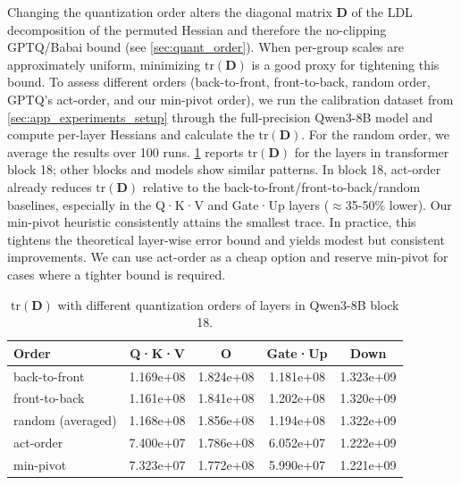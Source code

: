 \documentclass{article} %
\begin{document}
Changing the quantization order alters the diagonal matrix $\bm{D}$ of the LDL decomposition of the permuted Hessian and therefore the no-clipping GPTQ/Babai bound (see \cref{sec:quant_order}).
When per-group scales are approximately uniform, minimizing $\mathrm{tr} \left( \bm{D} \right)$ is a good proxy for tightening this bound.
To assess different orders (back-to-front, front-to-back, random order, GPTQ's act-order, and our min-pivot order), we run the calibration dataset from \cref{sec:app_experiments_setup} through the full-precision Qwen3-8B model and compute per-layer Hessians and calculate the $\mathrm{tr} \left( \bm{D} \right)$.
For the random order, we average the results over 100 runs.
\cref{tab:quant_order} reports $\mathrm{tr} \left( \bm{D} \right)$ for the layers in transformer block 18; other blocks and models show similar patterns.
In block 18, act-order already reduces $\mathrm{tr} \left( \bm{D} \right)$ relative to the back-to-front/front-to-back/random baselines, especially in the Q·K·V and Gate·Up layers ($\approx$35-50\% lower).
Our min-pivot heuristic consistently attains the smallest trace.
In practice, this tightens the theoretical layer-wise error bound and yields modest but consistent improvements.
We can use act-order as a cheap option and reserve min-pivot for cases where a tighter bound is required.

\begin{table}[htpb]
\caption{$\mathrm{tr} \left( \bm{D} \right)$ with different quantization orders of layers in Qwen3-8B block 18.}
\label{tab:quant_order}
\begin{center}
\begin{tabular}{lcccc}
\toprule
Order & Q·K·V & O & Gate·Up & Down \\
\midrule
back-to-front & 1.169e+08 & 1.824e+08 & 1.181e+08 & 1.323e+09 \\
\midrule
front-to-back & 1.161e+08 & 1.841e+08 & 1.202e+08 & 1.320e+09 \\
\midrule
random (averaged) & 1.168e+08 & 1.856e+08 & 1.194e+08 & 1.322e+09 \\
\midrule
act-order & 7.400e+07 & 1.786e+08 & 6.052e+07 & 1.222e+09 \\
\midrule
min-pivot & 7.323e+07 & 1.772e+08 & 5.990e+07 & 1.221e+09 \\
\bottomrule
\end{tabular}
\end{center}
\end{table}

\clearpage
\end{document}
